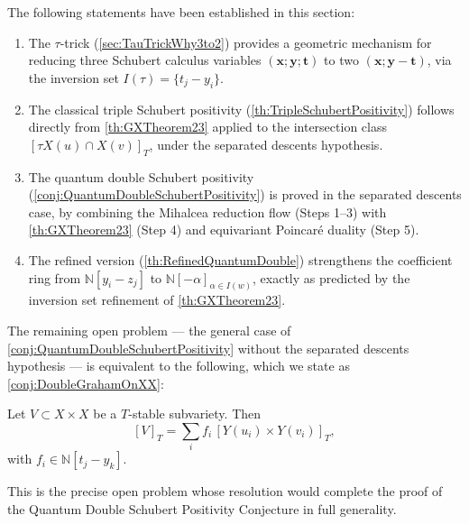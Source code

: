 \begin{Corollary}\label{cor:ProofSummary}
The following statements have been established in this section:
\begin{enumerate}
\item The $\tau$-trick (\cref{sec:TauTrickWhy3to2}) provides a geometric mechanism for reducing three Schubert calculus variables $(\mathbf{x};\mathbf{y};\mathbf{t})$ to two $(\mathbf{x};\mathbf{y}-\mathbf{t})$, via the inversion set $I(\tau) = \{t_j - y_i\}$.
\item The classical triple Schubert positivity (\cref{th:TripleSchubertPositivity}) follows directly from \cref{th:GXTheorem23} applied to the intersection class $[\tau X(u) \cap X(v)]_T$, under the separated descents hypothesis.
\item The quantum double Schubert positivity (\cref{conj:QuantumDoubleSchubertPositivity}) is proved in the separated descents case, by combining the Mihalcea reduction flow (Steps 1--3) with \cref{th:GXTheorem23} (Step 4) and equivariant Poincaré duality (Step 5).
\item The refined version (\cref{th:RefinedQuantumDouble}) strengthens the coefficient ring from $\mathbb{N}[y_i-z_j]$ to $\mathbb{N}[-\alpha]_{\alpha \in I(w)}$, exactly as predicted by the inversion set refinement of \cref{th:GXTheorem23}.
\end{enumerate}
\end{Corollary}

The remaining open problem — the general case of \cref{conj:QuantumDoubleSchubertPositivity} without the separated descents hypothesis — is equivalent to the following, which we state as \cref{conj:DoubleGrahamOnXX}:

\begin{Conjecture}\label{conj:DoubleGrahamOnXX}
Let $V \subset X \times X$ be a $T$-stable subvariety. Then
$$[V]_T = \sum_i f_i\, [Y(u_i) \times Y(v_i)]_T,$$
with $f_i \in \mathbb{N}[t_j - y_k]$.
\end{Conjecture}

This is the precise open problem whose resolution would complete the proof of the Quantum Double Schubert Positivity Conjecture in full generality.


